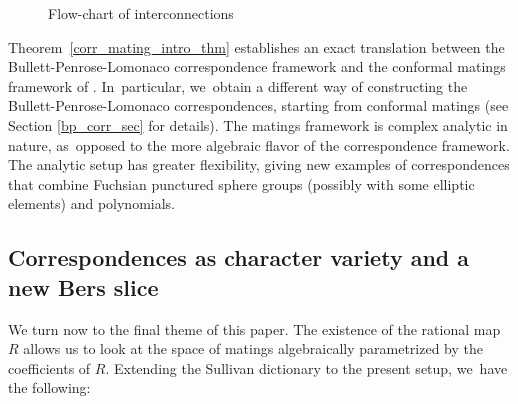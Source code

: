 \documentclass[JEP,XML,SOM,Unicode,NoFloatCountersInSection,published]{cedram}
\theoremstyle{definition}
\theoremstyle{remark}
\newcommand{\cC}{\mathcal{C}}
\newcommand{\cM}{\mathcal{M}}
\begin{document}
\begin{figure}[htb]
\vspace*{-\baselineskip}
\begin{Large}
\end{Large}
\vspace*{-.5\baselineskip}
\caption{Flow-chart of interconnections}
\label{intro_fig}
\end{figure}

Theorem~\ref{corr_mating_intro_thm} establishes an exact translation between the Bullett-Penrose-Lomonaco correspondence framework
\cite{BP94,B00,BL20a,BL20b,BL22} and the conformal matings framework of \cite{MM1}. In~particular, we~obtain a different way of constructing the Bullett-Penrose-Lomonaco correspondences, starting from conformal matings (see Section \ref{bp_corr_sec} for details). The matings framework is complex analytic in nature, as~opposed
to the more algebraic flavor of the correspondence framework. The analytic setup has greater
flexibility, giving new examples of correspondences that combine Fuchsian punctured sphere groups (possibly with some elliptic elements) and polynomials.

\subsection*{Correspondences as character variety and a new Bers slice}

We turn now to the final theme of this paper. The existence of the rational map
$R$ allows us to look at the space of matings algebraically parametrized by the coefficients of $R$. Extending the Sullivan dictionary to the present setup, we~have the following:
\end{document}
